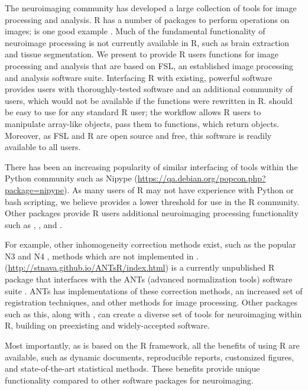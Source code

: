 The neuroimaging community has developed a large collection of tools for
image processing and analysis. R has a number of packages to perform
operations on images;  is one good example
\citep{EBImage}. Much of the fundamental functionality of neuroimage
processing is not currently available in R, such as brain extraction and
tissue segmentation. We present  to provide R users functions
for image processing and analysis that are based on FSL, an established
image processing and analysis software suite. Interfacing R with
existing, powerful software provides users with thoroughly-tested
software and an additional community of users, which would not be
available if the functions were rewritten in R.  should be
easy to use for any standard R user; the workflow allows R users to
manipulate array-like  objects, pass them to 
functions, which return  objects. Moreover, as FSL and R are
open source and free, this software is readily available to all users.

There has been an increasing popularity of similar interfacing of tools
within the Python community such as Nipype
\citep{gorgolewski_nipype:_2011}
(\url{https://qa.debian.org/popcon.php?package=nipype}). As many users
of R may not have experience with Python or bash scripting, we believe
 provides a lower threshold for use in the R community. Other
packages provide R users additional neuroimaging processing
functionality such as 
\citep{bordier_temporal_2011}, 
\citep{modat_rniftyreg:_2013}, and 
\citep{tabelow_statistical_2011}.

For example, other inhomogeneity correction methods exist, such as the
popular N3 \citep{sled_nonparametric_1998} and N4
\citep{tustison_n4itk:_2010}, methods which are not implemented in
.  (\url{http://stnava.github.io/ANTsR/index.html})
is a currently unpublished R package that interfaces with the ANTs
(advanced normalization tools) software suite
\citep{avants_reproducible_2011}. ANTs has implementations of these
correction methods, an increased set of registration techniques, and
other methods for image processing. Other packages such as this, along
with , can create a diverse set of tools for neuroimaging
within R, building on preexisting and widely-accepted software.

Most importantly, as  is based on the R framework, all the
benefits of using R are available, such as dynamic documents,
reproducible reports, customized figures, and state-of-the-art
statistical methods. These benefits provide unique functionality
compared to other software packages for neuroimaging.

